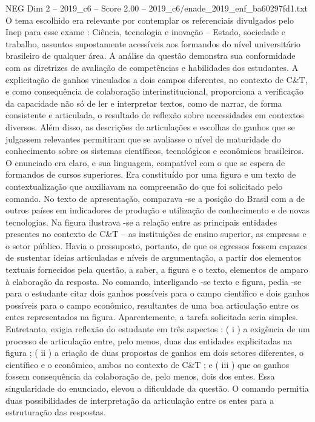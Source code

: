 \begin{textsample}{NEG Dim 2 – 2019\_c6 – Score 2.00 – 2019\_c6/enade\_2019\_enf\_ba60297fd1.txt}
O tema escolhido era relevante por contemplar os referenciais divulgados pelo Inep para esse exame : Ciência, tecnologia e inovação – Estado, sociedade e trabalho, assuntos supostamente acessíveis aos formandos do nível universitário brasileiro de qualquer área.
A análise da questão demonstra sua conformidade com as diretrizes de avaliação de competências e habilidades dos estudantes.
A explicitação de ganhos vinculados a dois campos diferentes, no contexto de C\&T, e como consequência de colaboração interinstitucional, proporciona a verificação da capacidade não só de ler e interpretar textos, como de narrar, de forma consistente e articulada, o resultado de reflexão sobre necessidades em contextos diversos.
Além disso, as descrições de articulações e escolhas de ganhos que se julgassem relevantes permitiram que se avaliasse o nível de maturidade do conhecimento sobre os sistemas científicos, tecnológicos e econômicos brasileiros.
O enunciado era claro, e sua linguagem, compatível com o que se espera de formandos de cursos superiores.
Era constituído por uma figura e um texto de contextualização que auxiliavam na compreensão do que foi solicitado pelo comando.
No texto de apresentação, comparava -se a posição do Brasil com a de outros países em indicadores de produção e utilização de conhecimento e de novas tecnologias.
Na figura ilustrava -se a relação entre as principais entidades presentes no contexto de C\&T – as instituições de ensino superior, as empresas e o setor público.
Havia o pressuposto, portanto, de que os egressos fossem capazes de sustentar ideias articuladas e níveis de argumentação, a partir dos elementos textuais fornecidos pela questão, a saber, a figura e o texto, elementos de amparo à elaboração da resposta.
No comando, interligando -se texto e figura, pedia -se para o estudante citar dois ganhos possíveis para o campo científico e dois ganhos possíveis para o campo econômico, resultantes de uma boa articulação entre os entes representados na figura.
Aparentemente, a tarefa solicitada seria simples.
Entretanto, exigia reflexão do estudante em três aspectos : ( i ) a exigência de um processo de articulação entre, pelo menos, duas das entidades explicitadas na figura ; ( ii ) a criação de duas propostas de ganhos em dois setores diferentes, o científico e o econômico, ambos no contexto de C\&T ; e ( iii ) que os ganhos fossem consequência da colaboração de, pelo menos, dois dos entes.
Essa singularidade do enunciado, elevou a dificuldade da questão.
O comando permitia duas possibilidades de interpretação da articulação entre os entes para a estruturação das respostas.

\end{textsample}
